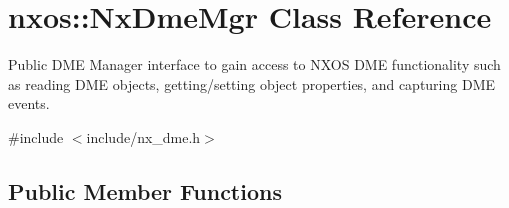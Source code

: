 \hypertarget{classnxos_1_1_nx_dme_mgr}{}\section{nxos\+:\+:Nx\+Dme\+Mgr Class Reference}
\label{classnxos_1_1_nx_dme_mgr}


Public D\+ME Manager interface to gain access to N\+X\+OS D\+ME functionality such as reading D\+ME objects, getting/setting object properties, and capturing D\+ME events.  




{\ttfamily \#include $<$include/nx\+\_\+dme.\+h$>$}

\subsection*{Public Member Functions}
